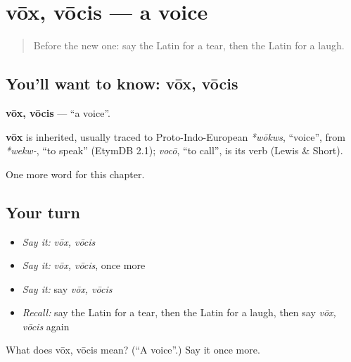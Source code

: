 \section[vōx, vōcis]{vōx, vōcis — a voice}

\label{lesson:LA-C174-vox}



\begin{quote}
Before the new one: say the Latin for a tear, then the Latin for a laugh.
\end{quote}

\subsection*{You'll want to know: vōx, vōcis}
\textbf{vōx, vōcis} — \textquotedblleft{}a voice\textquotedblright{}.

\begin{cousinweb}
\textbf{vōx} is inherited, usually traced to Proto-Indo-European \emph{*wōkws}, \textquotedblleft{}voice\textquotedblright{}, from \emph{*wekw-}, \textquotedblleft{}to speak\textquotedblright{} (EtymDB 2.1); \emph{vocō}, \textquotedblleft{}to call\textquotedblright{}, is its verb (Lewis \& Short).
\end{cousinweb}

\begin{grammarlens}[title={What you've built}]
One more word for this chapter.
\end{grammarlens}

\subsection*{Your turn}
\begin{itemize}
\raggedright
  \item \emph{Say it:} \emph{vōx, vōcis}
  \item \emph{Say it:} \emph{vōx, vōcis}, once more
  \item \emph{Say it:} say \emph{vōx, vōcis}
  \item \emph{Recall:} say the Latin for a tear, then the Latin for a laugh, then say \emph{vōx, vōcis} again
\end{itemize}

\begin{tcolorbox}[breakable,colback=teal!4,colframe=teal!35!black,title={Before you move on}]
What does vōx, vōcis mean? (\textquotedblleft{}A voice\textquotedblright{}.) Say it once more.
\end{tcolorbox}
